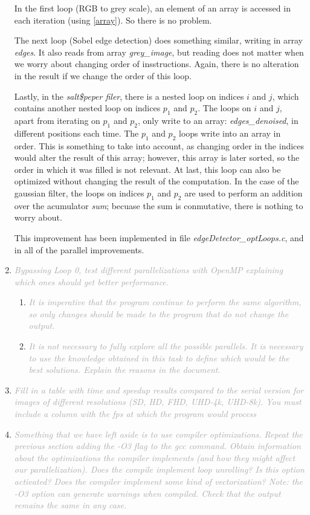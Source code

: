 \documentclass{article}
\newcommand{\greyItem}[1]{\item\emph{\textcolor{darkgray}{#1}}}
\begin{document}
\begin{enumerate}[label=5.\arabic*,leftmargin=*]
In the first loop (RGB to grey scale), an element of an array is accessed in each iteration (using \ref{array}). So there is no problem.

The next loop (Sobel edge detection) does something similar, writing in array \emph{edges}. It also reads from array \emph{grey\_image}, but reading does not matter when we worry about changing order of insstructions. Again, there is no alteration in the result if we change the order of this loop.

Lastly, in the \emph{salt\$peper filer}, there is a nested loop on indices $i$ and $j$, which contains another nested loop on indices $p_1$ and $p_2$. The loops on $i$ and $j$, apart from iterating on $p_1$ and $p_2$, only write to an array: \emph{edges\_denoised}, in different positions each time. The $p_1$ and $p_2$ loops write into an array in order. This is something to take into account, as changing order in the indices would alter the result of this array; however, this array is later sorted, so the order in which it was filled is not relevant. At last, this loop can also be optimized without changing the result of the computation. In the case of the gaussian filter, the loops on indices $p_1$ and $p_2$ are used to perform an addition over the acumulator \emph{sum}; becuase the sum is conmutative, there is nothing to worry about. 

This improvement has been implemented in file \emph{edgeDetector\_optLoops.c}, and in all of the parallel improvements.

\greyItem{Bypassing Loop 0, test different parallelizations with OpenMP explaining which ones should get better performance.}
    \begin{enumerate}
        \greyItem{It is imperative that the program continue to perform the same algorithm, so only changes should be made to the program that do not change the output.}
            
        \greyItem{It is not necessary to fully explore all the possible parallels. It is necessary to use the knowledge obtained in this task to define which would be the best solutions. Explain the reasons in the
        document.}
    \end{enumerate}


\greyItem{Fill in a table with time and speedup results compared to the serial version for images of different resolutions (SD, HD, FHD, UHD-4k, UHD-8k). You must include a column with the fps at which the program would process}

\greyItem{Something that we have left aside is to use compiler optimizations. Repeat the previous section adding the -O3 flag to the gcc command. Obtain information about the optimizations the compiler implements (and how they might affect our parallelization). Does the compile implement loop unrolling? Is this option activated? Does the compiler implement some kind of vectorization? Note: the -O3 option can generate warnings when compiled. Check that the output remains the same in any case.}

\end{enumerate}
\end{document}
